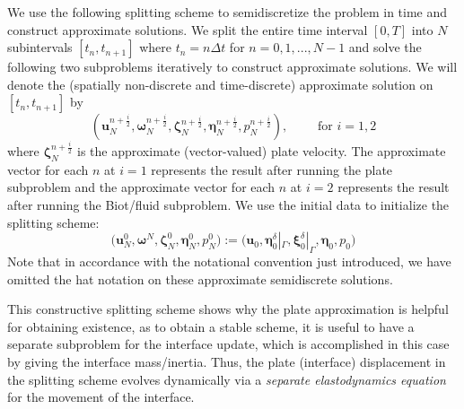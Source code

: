 \documentclass[11pt]{article}
\newcommand{\bd}{\boldsymbol}
\theoremstyle{definition}
\begin{document}
We use the following splitting scheme to semidiscretize the problem in time and construct approximate solutions. We split the entire time interval $[0, T]$ into $N$ subintervals $[t_{n}, t_{n + 1}]$ where $t_{n} = n\Delta t$ for $n = 0, 1, ..., N - 1$ and solve the following two subproblems iteratively to construct approximate solutions. We will denote the (spatially non-discrete and time-discrete) approximate solution on $[t_{n}, t_{n + 1}]$ by
\begin{equation*}
\left(\bd{u}^{n + \frac{i}{2}}_{N}, \bd{\omega}^{n + \frac{i}{2}}_{N}, \bd{\zeta}^{n + \frac{i}{2}}_{N}, \bd{\eta}^{n + \frac{i}{2}}_{N}, p^{n + \frac{i}{2}}_{N}\right), \qquad \text{ for } i = 1, 2
\end{equation*}
where $\bd{\zeta}^{n + \frac{i}{2}}_{N}$ is the approximate (vector-valued) plate velocity. The approximate vector for each $n$ at $i = 1$ represents the result after running the plate subproblem and the approximate vector for each $n$ at $i = 2$ represents the result after running the Biot/fluid subproblem. We use the initial data to initialize the splitting scheme:
\begin{equation*}
\Big(\bd{u}^{0}_{N}, \bd{\omega}^{N}, \bd{\zeta}^{0}_{N}, \bd{\eta}^{0}_{N}, p^{0}_{N}\Big) := \Big(\bd{u}_{0}, \bd{\eta}_{0}^{\delta}|_{\Gamma}, \bd{\xi}_{0}^{\delta}|_{\Gamma}, \bd{\eta}_{0}, p_{0}\Big)
\end{equation*}
Note that in accordance with the notational convention just introduced, we have omitted the hat notation on these approximate semidiscrete solutions.

This constructive splitting scheme shows why the plate approximation is helpful for obtaining existence, as to obtain a stable scheme, it is useful to have a separate subproblem for the interface update, which is accomplished in this case by giving the interface mass/inertia. Thus, the plate (interface) displacement in the splitting scheme evolves dynamically via a \textit{separate elastodynamics equation} for the movement of the interface.

\medskip
\end{document}
